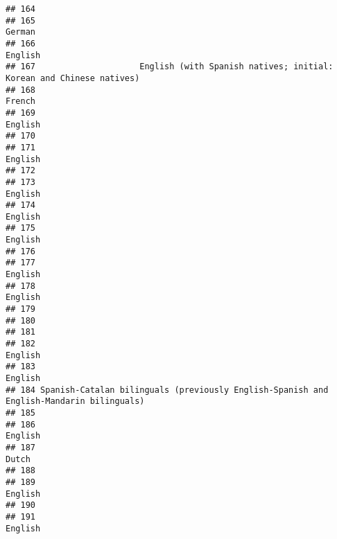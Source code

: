 \documentclass[
  english,
  man]{apa6}
\begin{document}
\begin{verbatim}
## 164                                                                                        
## 165                                                                                  German
## 166                                                                                 English
## 167                     English (with Spanish natives; initial: Korean and Chinese natives)
## 168                                                                                  French
## 169                                                                                 English
## 170                                                                                        
## 171                                                                                 English
## 172                                                                                        
## 173                                                                                 English
## 174                                                                                 English
## 175                                                                                 English
## 176                                                                                        
## 177                                                                                 English
## 178                                                                                 English
## 179                                                                                        
## 180                                                                                        
## 181                                                                                        
## 182                                                                                 English
## 183                                                                                 English
## 184 Spanish-Catalan bilinguals (previously English-Spanish and English-Mandarin bilinguals)
## 185                                                                                        
## 186                                                                                 English
## 187                                                                                   Dutch
## 188                                                                                        
## 189                                                                                 English
## 190                                                                                        
## 191                                                                                 English

\end{verbatim}
\end{document}
